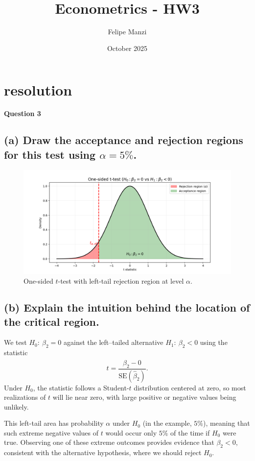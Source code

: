 \documentclass{article}
\title{Econometrics - HW3}
\author{Felipe Manzi}
\date{October 2025}
\begin{document}
\maketitle

\section{resolution}

\textbf{Question 3 } 

\subsection*{(a) Draw the acceptance and rejection regions for this test using $\alpha = 5\%$.}

\begin{figure}[H]
  \centering
  \includegraphics[width=0.9\linewidth]{example_critical_region.png}
  \caption{One-sided $t$-test with left-tail rejection region at level $\alpha$.}
\end{figure}

\subsection*{(b) Explain the intuition behind the location of the critical region.}

We test $H_0:\ \beta_2 = 0$ against the left--tailed alternative 
$H_1:\ \beta_2 < 0$ using the statistic
\[
t = \frac{\widehat{\beta}_2 - 0}{\mathrm{SE}(\widehat{\beta}_2)}.
\]
Under $H_0$, the statistic follows a Student-$t$ distribution centered at zero,
so most realizations of $t$ will lie near zero, with large positive or negative
values being unlikely.

This left-tail area has probability $\alpha$ under $H_0$ (in the example, $5\%$),
meaning that such extreme negative values of $t$ would occur only $5\%$ of the
time if $H_0$ were true. Observing one of these extreme outcomes provides
evidence that $\beta_2 < 0$, consistent with the alternative hypothesis, where we should reject $H_0$.
\end{document}
